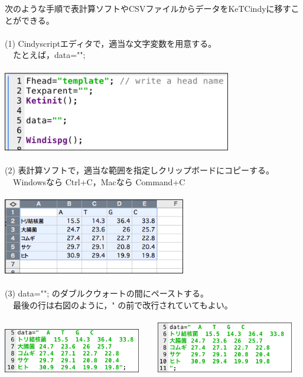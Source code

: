\documentclass[papersize,a4paper,12pt,uplatex]{jsarticle}
\begin{document}
\begin{description}
次のような手順で表計算ソフトやCSVファイルからデータをKeTCindyに移すことができる。\\
　\\
(1) Cindyscriptエディタで，適当な文字変数を用意する。\\
　たとえば，data="";\\
　\\
\includegraphics[bb=0 0 858 298 , width=10cm]{Fig/tab2list02.png}\\
　\\
(2) 表計算ソフトで，適当な範囲を指定しクリップボードにコピーする。\\
　Windowsなら Ctrl+C，Macなら Command+C\\
　\\
\includegraphics[bb=0 0 742 308 , width=8cm]{Fig/tab2list01.png}\\
　\\
(3) data=""; のダブルクウォートの間にペーストする。\\
　最後の行は右図のように，" の前で改行されていてもよい。\\
　\\
\includegraphics[bb=0 0 738 236 , width=6cm]{Fig/tab2list00.png}
　　\includegraphics[bb=0 0 748 276 , width=6cm]{Fig/tab2list001.png}\\
　\\

\end{description}
\end{document}
